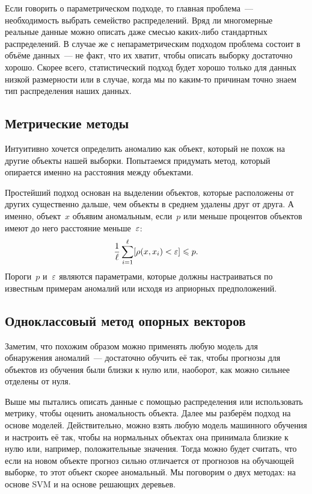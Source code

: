 \documentclass[12pt,fleqn]{article}
\begin{document}
Если говорить о параметрическом подходе, то главная проблема~--- необходимость выбрать семейство распределений.
Вряд ли многомерные реальные данные можно описать даже смесью каких-либо стандартных распределений.
В случае же с непараметрическим подходом проблема состоит в объёме данных~--- не факт, что их хватит,
чтобы описать выборку достаточно хорошо.
Скорее всего, статистический подход будет хорошо только для данных низкой размерности или в случае,
когда мы по каким-то причинам точно знаем тип распределения наших данных.

\subsection{Метрические методы}

Интуитивно хочется определить аномалию как объект, который не похож на другие объекты нашей выборки.
Попытаемся придумать метод, который опирается именно на расстояния между объектами.

Простейший подход основан на выделении объектов, которые расположены от других
существенно дальше, чем объекты в среднем удалены друг от друга.
А именно, объект~$x$ объявим аномальным, если~$p$ или меньше процентов объектов
имеют до него расстояние меньше~$\varepsilon$:
\[
    \frac{1}{\ell}
    \sum_{i = 1}^{\ell}
        [\rho(x, x_i) < \varepsilon]
    \leqslant
    p.
\]
Пороги~$p$ и~$\varepsilon$ являются параметрами, которые должны настраиваться
по известным примерам аномалий или исходя из априорных предположений.


\subsection{Одноклассовый метод опорных векторов}

Заметим, что похожим образом можно применять любую модель для обнаружения аномалий~---
достаточно обучить её так, чтобы прогнозы для объектов из обучения были близки к нулю
или, наоборот, как можно сильнее отделены от нуля.

Выше мы пытались описать данные с помощью распределения или использовать метрику, чтобы оценить аномальность объекта.
Далее мы разберём подход на основе моделей.
Действительно, можно взять любую модель машинного обучения и настроить её так,
чтобы на нормальных объектах она принимала близкие к нулю или, например, положительные значения.
Тогда можно будет считать, что если на новом объекте прогноз сильно отличается от прогнозов на обучающей выборке,
то этот объект скорее аномальный.
Мы поговорим о двух методах: на основе SVM и на основе решающих деревьев.
\end{document}
